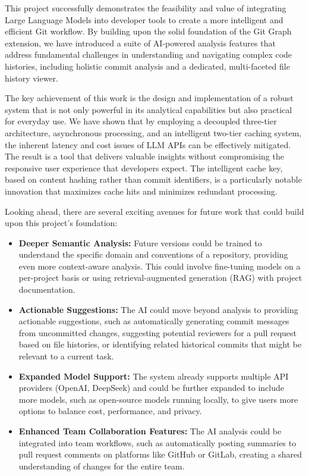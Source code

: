 This project successfully demonstrates the feasibility and value of integrating Large Language Models into developer tools to create a more intelligent and efficient Git workflow. By building upon the solid foundation of the Git Graph extension, we have introduced a suite of AI-powered analysis features that address fundamental challenges in understanding and navigating complex code histories, including holistic commit analysis and a dedicated, multi-faceted file history viewer.

The key achievement of this work is the design and implementation of a robust system that is not only powerful in its analytical capabilities but also practical for everyday use. We have shown that by employing a decoupled three-tier architecture, asynchronous processing, and an intelligent two-tier caching system, the inherent latency and cost issues of LLM APIs can be effectively mitigated. The result is a tool that delivers valuable insights without compromising the responsive user experience that developers expect. The intelligent cache key, based on content hashing rather than commit identifiers, is a particularly notable innovation that maximizes cache hits and minimizes redundant processing.

Looking ahead, there are several exciting avenues for future work that could build upon this project's foundation:

\begin{itemize}
    \item \textbf{Deeper Semantic Analysis:} Future versions could be trained to understand the specific domain and conventions of a repository, providing even more context-aware analysis. This could involve fine-tuning models on a per-project basis or using retrieval-augmented generation (RAG) with project documentation.
    
    \item \textbf{Actionable Suggestions:} The AI could move beyond analysis to providing actionable suggestions, such as automatically generating commit messages from uncommitted changes, suggesting potential reviewers for a pull request based on file histories, or identifying related historical commits that might be relevant to a current task.
    
    \item \textbf{Expanded Model Support:} The system already supports multiple API providers (OpenAI, DeepSeek) and could be further expanded to include more models, such as open-source models running locally, to give users more options to balance cost, performance, and privacy.
    
    \item \textbf{Enhanced Team Collaboration Features:} The AI analysis could be integrated into team workflows, such as automatically posting summaries to pull request comments on platforms like GitHub or GitLab, creating a shared understanding of changes for the entire team.
\end{itemize}

